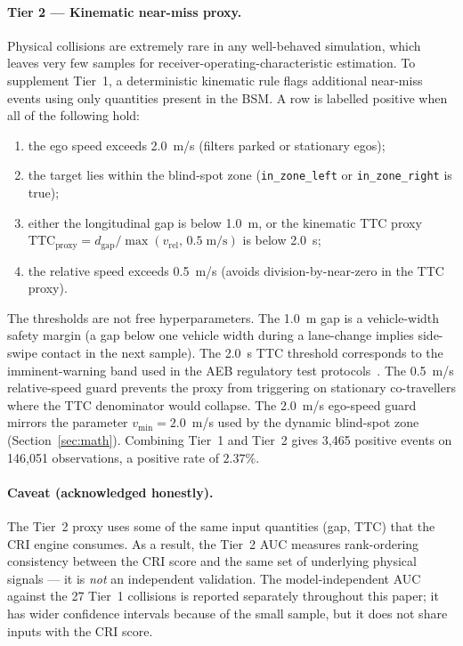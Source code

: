 \documentclass[sn-mathphys-num,Numbered,iicol]{sn-jnl}
\begin{document}
\paragraph{Tier 2 --- Kinematic near-miss proxy.}
Physical collisions are extremely rare in any well-behaved simulation, which leaves very few samples for receiver-operating-characteristic estimation. To supplement Tier~1, a deterministic kinematic rule flags additional near-miss events using only quantities present in the BSM. A row is labelled positive when all of the following hold:
\begin{enumerate}
\item the ego speed exceeds 2.0~m/s (filters parked or stationary egos);
\item the target lies within the blind-spot zone (\texttt{in\_zone\_left} or \texttt{in\_zone\_right} is true);
\item either the longitudinal gap is below 1.0~m, or the kinematic TTC proxy
       $\mathrm{TTC}_{\mathrm{proxy}} = d_{\mathrm{gap}}/\max(v_{\mathrm{rel}},\,0.5\;\mathrm{m/s})$
       is below 2.0~s;
\item the relative speed exceeds 0.5~m/s (avoids division-by-near-zero in the TTC proxy).
\end{enumerate}
The thresholds are not free hyperparameters. The 1.0~m gap is a vehicle-width safety margin (a gap below one vehicle width during a lane-change implies side-swipe contact in the next sample). The 2.0~s TTC threshold corresponds to the imminent-warning band used in the AEB regulatory test protocols~\cite{nhtsa_fcw2013,euroncap2019}. The 0.5~m/s relative-speed guard prevents the proxy from triggering on stationary co-travellers where the TTC denominator would collapse. The 2.0~m/s ego-speed guard mirrors the parameter $v_{\min} = 2.0$~m/s used by the dynamic blind-spot zone (Section~\ref{sec:math}). Combining Tier~1 and Tier~2 gives 3{,}465 positive events on 146{,}051 observations, a positive rate of $2.37\%$.

\paragraph{Caveat (acknowledged honestly).}
The Tier~2 proxy uses some of the same input quantities (gap, TTC) that the CRI engine consumes. As a result, the Tier~2 AUC measures rank-ordering consistency between the CRI score and the same set of underlying physical signals --- it is \emph{not} an independent validation. The model-independent AUC against the 27 Tier~1 collisions is reported separately throughout this paper; it has wider confidence intervals because of the small sample, but it does not share inputs with the CRI score.
\end{document}
